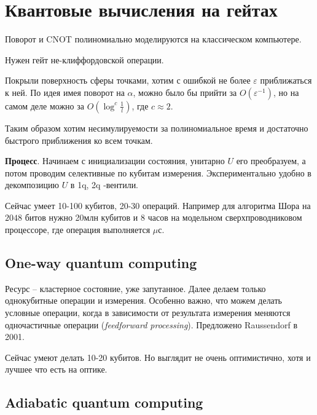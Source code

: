 \section{Квантовые вычисления на гейтах}

\begin{to_thr}
    Поворот и CNOT полиномиально моделируются на классическом компьютере.
\end{to_thr}


Нужен гейт не-клиффордовской операции. 

\begin{to_thr}
    Покрыли поверхность сферы точками, хотим с ошибкой не более $\varepsilon$ приближаться к ней. По идея имея поворот на $\alpha$, можно было бы прийти за $O(\varepsilon^{-1})$, но на самом деле можно за $O(\log^c \frac{1}{l})$, где $c \approx 2$. 
\end{to_thr}


Таким образом хотим несимулируемости за полиномиальное время и достаточно быстрого приближения ко всем точкам. 

\textbf{Процесс}. 
Начинаем с инициализации состояния, унитарно $U$ его преобразуем, а потом проводим селективные по кубитам измерения.  Экспериментально удобно в декомпозицию $U$ в 1q, 2q -вентили. 

Сейчас умеет 10-100 кубитов, 20-30 операций. Например для алгоритма Шора на $2048$ битов нужно 20млн кубитов и 8 часов на модельном сверхпроводниковом процессоре, где операция выполняется $\mu$с.



\subsection*{One-way quantum computing}

Ресурс -- кластерное состояние, уже запутанное. Далее делаем только однокубитные операции и измерения. Особенно важно, что можем делать условные операции, когда в зависимости от результата измерения меняются одночастичные операции (\textit{feedforward processing}). Предложено Raussendorf в 2001. 

Сейчас умеют делать 10-20 кубитов. Но выглядит не очень оптимистично, хотя и лучшее что есть на оптике. 



\subsection*{Adiabatic quantum computing}


